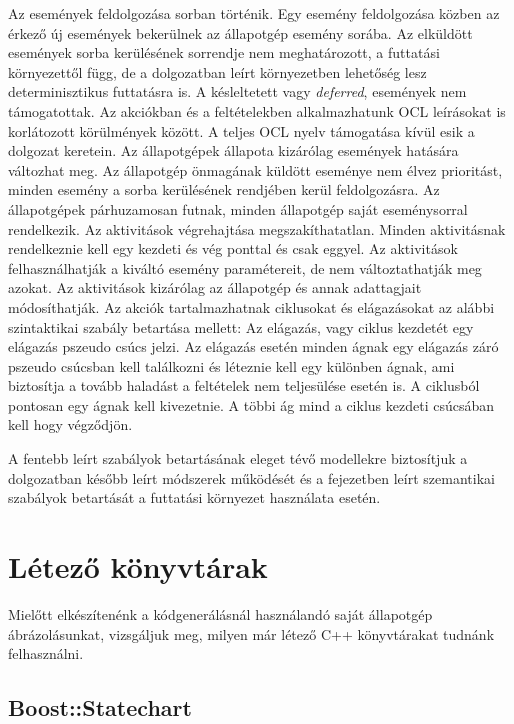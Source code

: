 \documentclass[a4paper,12pt]{report}
\begin{document}
Az események feldolgozása sorban történik. Egy esemény feldolgozása közben az érkező új események bekerülnek az állapotgép esemény sorába. Az elküldött események sorba kerülésének sorrendje nem meghatározott, a futtatási környezettől függ, de a dolgozatban leírt környezetben lehetőség lesz determinisztikus futtatásra is.
A késleltetett vagy {\it deferred}, események nem támogatottak. Az akciókban és a feltételekben alkalmazhatunk OCL\cite{omg20052}
leírásokat is korlátozott körülmények között. A teljes OCL nyelv támogatása kívül esik a dolgozat keretein.
Az állapotgépek állapota kizárólag események hatására változhat meg. Az állapotgép önmagának küldött eseménye nem élvez prioritást, minden esemény a sorba kerülésének rendjében kerül feldolgozásra. Az állapotgépek párhuzamosan futnak, minden állapotgép saját eseménysorral rendelkezik. Az aktivitások végrehajtása megszakíthatatlan. Minden aktivitásnak rendelkeznie kell egy kezdeti és vég ponttal és csak eggyel. Az aktivitások felhasználhatják a kiváltó esemény paramétereit, de nem változtathatják meg azokat. Az aktivitások kizárólag az állapotgép és annak adattagjait módosíthatják. Az akciók tartalmazhatnak ciklusokat és elágazásokat az alábbi szintaktikai szabály betartása mellett: Az elágazás, vagy ciklus kezdetét egy elágazás pszeudo csúcs jelzi. Az elágazás esetén minden ágnak egy elágazás záró pszeudo csúcsban kell találkozni és léteznie kell egy különben ágnak, ami biztosítja a tovább haladást a feltételek nem teljesülése esetén is.
A ciklusból pontosan egy ágnak kell kivezetnie. A többi ág mind a ciklus kezdeti csúcsában kell hogy végződjön.

A fentebb leírt szabályok betartásának eleget tévő modellekre biztosítjuk a dolgozatban később leírt módszerek működését és a fejezetben leírt szemantikai szabályok betartását a futtatási környezet használata esetén.

\section{Létező könyvtárak}

Mielőtt elkészítenénk a kódgenerálásnál használandó saját állapotgép ábrázolásunkat, vizsgáljuk meg, milyen már létező C++ könyvtárakat tudnánk felhasználni.

\subsection{Boost::Statechart}
\end{document}
